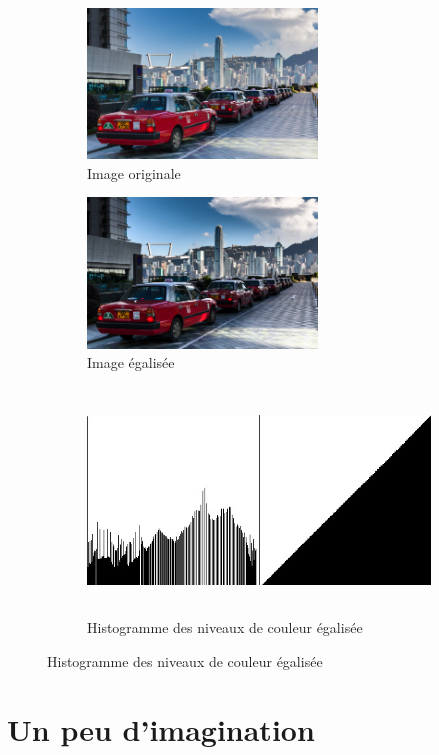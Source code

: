 \documentclass[a4paper,10pt]{article}
\begin{document}
    \begin{figure}[h]
      \begin{subfigure}{0.5\textwidth}
        \includegraphics[width=1\linewidth, height=4cm]{kowloon}
        \caption{Image originale}
        \label{fig:kowloonO2}
      \end{subfigure}
      \begin{subfigure}{0.5\textwidth}
        \includegraphics[width=1\linewidth, height=4cm]{kowloon_egalise.jpeg}
        \caption{Image égalisée}
        \label{fig:kowloonEg}
      \end{subfigure}
      \begin{subfigure}{1\textwidth}
        \centering
        \includegraphics[width=1\linewidth, height=6cm]{kowloon_histoEq.jpeg}   
        \caption{Histogramme des niveaux de couleur égalisée}
        \label{fig:kowloonHistoEg}
      \end{subfigure}
    \end{figure}

    \pagebreak
    \section{Un peu d'imagination}
\end{document}
